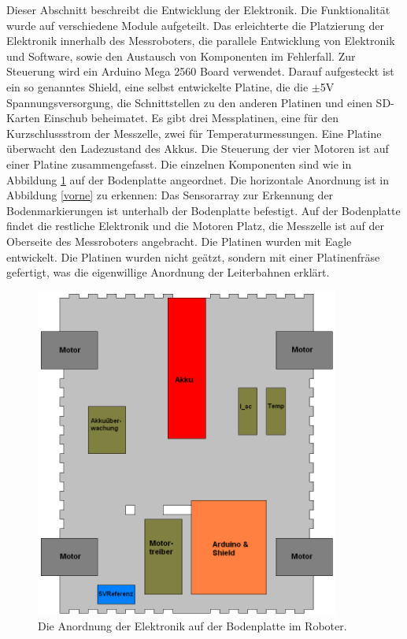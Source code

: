 \documentclass[a4paper,bibtotoc,oneside]{scrbook}
\begin{document}
Dieser Abschnitt beschreibt die Entwicklung der Elektronik. Die Funktionalität wurde auf verschiedene Module aufgeteilt. Das erleichterte die Platzierung der Elektronik innerhalb des Messroboters, die parallele Entwicklung von Elektronik und Software, sowie den Austausch von Komponenten im Fehlerfall. 
Zur Steuerung wird ein Arduino Mega 2560 Board verwendet. Darauf aufgesteckt ist ein so genanntes Shield, eine selbst entwickelte Platine, die die $\pm$5V Spannungsversorgung, die Schnittstellen zu den anderen Platinen und einen SD-Karten Einschub beheimatet.
Es gibt drei Messplatinen, eine für den Kurzschlussstrom der Messzelle, zwei für Temperaturmessungen. Eine Platine überwacht den Ladezustand des Akkus. Die Steuerung der vier Motoren ist auf einer Platine zusammengefasst.
Die einzelnen Komponenten sind wie in Abbildung \ref{elek} auf der Bodenplatte angeordnet.
Die horizontale Anordnung ist in Abbildung \ref{vorne} zu erkennen: Das Sensorarray zur Erkennung der Bodenmarkierungen ist unterhalb der Bodenplatte befestigt. Auf der Bodenplatte findet die restliche Elektronik und die Motoren Platz, die Messzelle ist auf der Oberseite des Messroboters angebracht.
Die Platinen wurden mit Eagle entwickelt. Die Platinen wurden nicht geätzt, sondern mit einer Platinenfräse gefertigt, was die eigenwillige Anordnung der Leiterbahnen erklärt. 
\begin{figure}[htbp]
\centering
\includegraphics[width=100mm]{img/bodenplatte.png}
\caption{Die Anordnung der Elektronik auf der Bodenplatte im Roboter.}\label{elek}
\end{figure}
 
\end{document}
